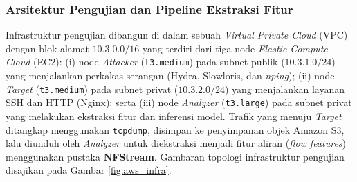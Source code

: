 \documentclass[11pt, a4paper]{article}
\begin{document}
\subsubsection{Arsitektur Pengujian dan Pipeline Ekstraksi Fitur}
Infrastruktur pengujian dibangun di dalam sebuah \textit{Virtual Private Cloud} (VPC) dengan blok alamat $10.3.0.0/16$ yang terdiri dari tiga node \textit{Elastic Compute Cloud} (EC2): (i) node \textit{Attacker} (\texttt{t3.medium}) pada subnet publik ($10.3.1.0/24$) yang menjalankan perkakas serangan (Hydra, Slowloris, dan \textit{nping}); (ii) node \textit{Target} (\texttt{t3.medium}) pada subnet privat ($10.3.2.0/24$) yang menjalankan layanan SSH dan HTTP (Nginx); serta (iii) node \textit{Analyzer} (\texttt{t3.large}) pada subnet privat yang melakukan ekstraksi fitur dan inferensi model. Trafik yang menuju \textit{Target} ditangkap menggunakan \texttt{tcpdump}, disimpan ke penyimpanan objek Amazon S3, lalu diunduh oleh \textit{Analyzer} untuk diekstraksi menjadi fitur aliran (\textit{flow features}) menggunakan pustaka \textbf{NFStream}. Gambaran topologi infrastruktur pengujian disajikan pada Gambar \ref{fig:aws_infra}.
\end{document}
